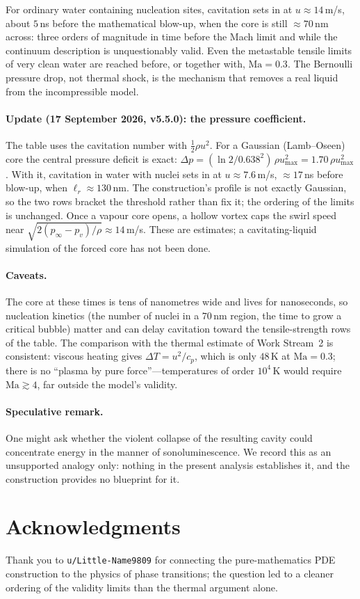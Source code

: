 \documentclass[11pt]{article}
\begin{document}
For ordinary water containing nucleation sites, cavitation sets in at $u \approx 14$\,m/s, about $5$\,ns before the mathematical blow-up, when the core is still $\approx 70$\,nm across: three orders of magnitude in time before the Mach limit and while the continuum description is unquestionably valid. Even the metastable tensile limits of very clean water are reached before, or together with, $\mathrm{Ma} = 0.3$. The Bernoulli pressure drop, not thermal shock, is the mechanism that removes a real liquid from the incompressible model.

\paragraph{Update (17 September 2026, v5.5.0): the pressure coefficient.} The table uses the cavitation number with $\tfrac12\rho u^2$. For a Gaussian (Lamb--Oseen) core the central pressure deficit is exact: $\Delta p = (\ln 2/0.638^2)\,\rho u_{\max}^2 = 1.70\,\rho u_{\max}^2$. With it, cavitation in water with nuclei sets in at $u\approx7.6$\,m/s, $\approx17$\,ns before blow-up, when $\ell_r\approx130$\,nm. The construction's profile is not exactly Gaussian, so the two rows bracket the threshold rather than fix it; the ordering of the limits is unchanged. Once a vapour core opens, a hollow vortex caps the swirl speed near $\sqrt{2(p_\infty-p_v)/\rho}\approx14$\,m/s. These are estimates; a cavitating-liquid simulation of the forced core has not been done.

\paragraph{Caveats.} The core at these times is tens of nanometres wide and lives for nanoseconds, so nucleation kinetics (the number of nuclei in a $70$\,nm region, the time to grow a critical bubble) matter and can delay cavitation toward the tensile-strength rows of the table. The comparison with the thermal estimate of Work Stream~2 is consistent: viscous heating gives $\Delta T = u^2/c_p$, which is only $48$\,K at $\mathrm{Ma} = 0.3$; there is no ``plasma by pure force''---temperatures of order $10^4$\,K would require $\mathrm{Ma} \gtrsim 4$, far outside the model's validity.

\paragraph{Speculative remark.} One might ask whether the violent collapse of the resulting cavity could concentrate energy in the manner of sonoluminescence. We record this as an unsupported analogy only: nothing in the present analysis establishes it, and the construction provides no blueprint for it.

\section{Acknowledgments}
Thank you to \texttt{u/Little-Name9809} for connecting the pure-mathematics PDE construction to the physics of phase transitions; the question led to a cleaner ordering of the validity limits than the thermal argument alone.
\end{document}
